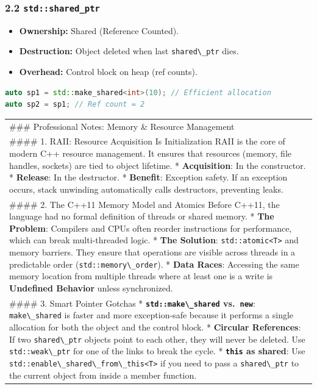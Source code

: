 \hypertarget{stdshared_ptr}{%
\subsubsection{\texorpdfstring{2.2
\texttt{std::shared\_ptr}}{2.2 std::shared\_ptr}}\label{stdshared_ptr}}

\begin{itemize}
\tightlist
\item
  \textbf{Ownership:} Shared (Reference Counted).
\item
  \textbf{Destruction:} Object deleted when last
  \passthrough{\lstinline!shared\_ptr!} dies.
\item
  \textbf{Overhead:} Control block on heap (ref counts).
\end{itemize}

\begin{lstlisting}[language={C++}]
auto sp1 = std::make_shared<int>(10); // Efficient allocation
auto sp2 = sp1; // Ref count = 2
\end{lstlisting}

\begin{longtable}[]{@{}
  >{\raggedright\arraybackslash}p{}@{}}
\toprule
\endhead
\#\#\# Professional Notes: Memory \& Resource Management \\
\#\#\#\# 1. RAII: Resource Acquisition Is Initialization RAII is the
core of modern C++ resource management. It ensures that resources
(memory, file handles, sockets) are tied to object lifetime. *
\textbf{Acquisition}: In the constructor. * \textbf{Release}: In the
destructor. * \textbf{Benefit}: Exception safety. If an exception
occurs, stack unwinding automatically calls destructors, preventing
leaks. \\
\#\#\#\# 2. The C++11 Memory Model and Atomics Before C++11, the
language had no formal definition of threads or shared memory. *
\textbf{The Problem}: Compilers and CPUs often reorder instructions for
performance, which can break multi-threaded logic. * \textbf{The
Solution}: \passthrough{\lstinline!std::atomic<T>!} and memory barriers.
They ensure that operations are visible across threads in a predictable
order (\passthrough{\lstinline!std::memory\_order!}). * \textbf{Data
Races}: Accessing the same memory location from multiple threads where
at least one is a write is \textbf{Undefined Behavior} unless
synchronized. \\
\#\#\#\# 3. Smart Pointer Gotchas *
\textbf{\passthrough{\lstinline!std::make\_shared!}
vs.~\passthrough{\lstinline!new!}}:
\passthrough{\lstinline!make\_shared!} is faster and more exception-safe
because it performs a single allocation for both the object and the
control block. * \textbf{Circular References}: If two
\passthrough{\lstinline!shared\_ptr!} objects point to each other, they
will never be deleted. Use \passthrough{\lstinline!std::weak\_ptr!} for
one of the links to break the cycle. *
\textbf{\passthrough{\lstinline!this!} as shared}: Use
\passthrough{\lstinline!std::enable\_shared\_from\_this<T>!} if you need
to pass a \passthrough{\lstinline!shared\_ptr!} to the current object
from inside a member function. \\
\bottomrule
\end{longtable}

